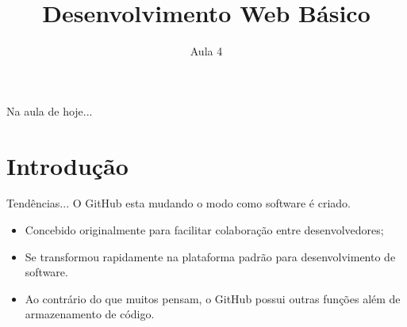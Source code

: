 \documentclass{beamer}
\title{Desenvolvimento Web Básico}
\subtitle{Aula 4}
\begin{document}
\frame{
 \titlepage
}

\begin{frame}{Na aula de hoje...} 
\tableofcontents 
\end{frame}

\section{Introdução}
\begin{frame}{Tendências...}
  O GitHub esta mudando o modo como software é criado.
\begin{itemize}
  \item Concebido originalmente para facilitar colaboração entre 
desenvolvedores;
   \item Se transformou rapidamente na plataforma padrão para 
desenvolvimento de software.
   \item Ao contrário do que muitos pensam, o GitHub possui outras 
funções além de armazenamento de código.
\end{itemize}
\end{frame}
\end{document}
